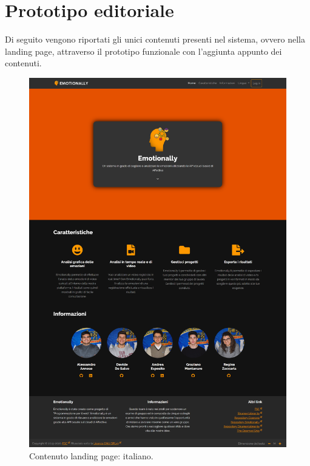 
\chapter{Prototipo editoriale}\label{chap:prototipo-editoriale}
Di seguito vengono riportati gli unici contenuti presenti nel sistema, ovvero 
nella landing page, attraverso il prototipo funzionale con l'aggiunta appunto 
dei contenuti.
 
\begin{figure}[H]
	\centering
	\caption{Contenuto landing page: italiano.}
	\label{fig:contenuto-landing:italiano}
	\includegraphics[width=\textwidth]{images/prototipo-editoriale/ita}
\end{figure}

